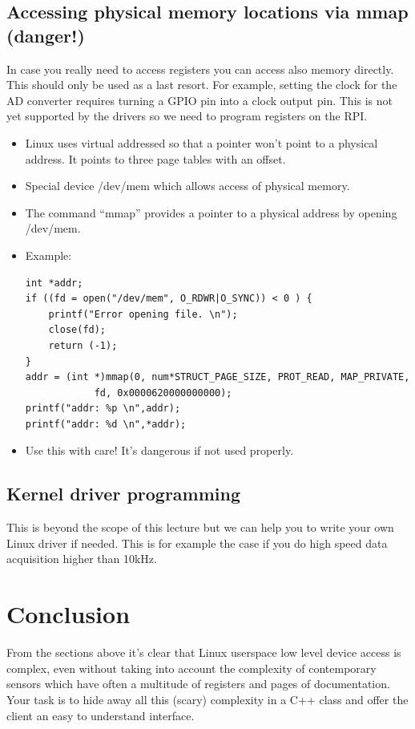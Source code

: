 \documentclass[12pt]{article}
\begin{document}
\subsection{Accessing physical memory locations via mmap (danger!)}
In case you really need to access registers you can access
also memory directly. This should only be used as a last resort.
For example, setting the clock for the AD converter requires
turning a GPIO pin into a clock output pin. This is not yet
supported by the drivers so we need to program registers
on the RPI.
\begin{itemize}
\item Linux uses virtual addressed so that a pointer won't
point to a physical address. It points to three page
tables with an offset.
\item Special device /dev/mem which allows access of physical
memory.
\item The command ``mmap'' provides a pointer to a physical
address by opening /dev/mem.
\item Example:
\begin{verbatim}
int *addr;
if ((fd = open("/dev/mem", O_RDWR|O_SYNC)) < 0 ) {
    printf("Error opening file. \n");
    close(fd);
    return (-1);
}
addr = (int *)mmap(0, num*STRUCT_PAGE_SIZE, PROT_READ, MAP_PRIVATE,
            fd, 0x0000620000000000);
printf("addr: %p \n",addr);
printf("addr: %d \n",*addr);
\end{verbatim}
\item Use this with care! It's dangerous if not used properly.
\end{itemize}

\subsection{Kernel driver programming}

This is beyond the scope of this lecture but we can help you to write
your own Linux driver if needed. This is for example the case if you
do high speed data acquisition higher than 10kHz.

\section{Conclusion}

From the sections above it's clear that Linux userspace low level
device access is complex, even without taking into account the
complexity of contemporary sensors which have often a multitude of
registers and pages of documentation. Your task is to hide away
all this (scary) complexity in a C++ class and offer the client
an easy to understand interface.
\end{document}
